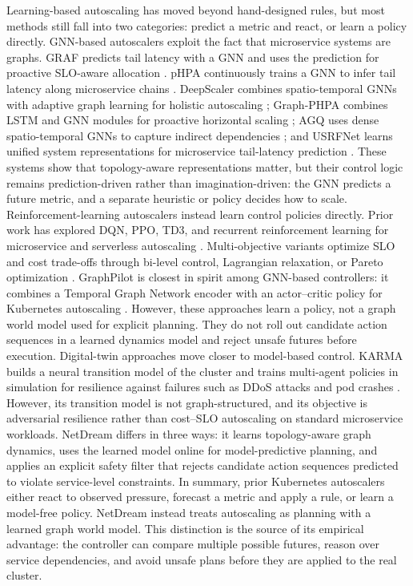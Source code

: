 Learning-based autoscaling has moved beyond hand-designed rules, but
most methods still fall into two categories: predict a metric and react,
or learn a policy directly.  GNN-based autoscalers exploit the fact that
microservice systems are graphs.  GRAF predicts tail latency with a GNN
and uses the prediction for proactive SLO-aware allocation
\citep{park2021graf}.  pHPA continuously trains a GNN to infer tail
latency along microservice chains \citep{choi2021phpa}.  DeepScaler
combines spatio-temporal GNNs with adaptive graph learning for holistic
autoscaling \citep{meng2023deepscaler}; Graph-PHPA combines LSTM and GNN
modules for proactive horizontal scaling \citep{dang2022graphphpa}; AGQ
uses dense spatio-temporal GNNs to capture indirect dependencies
\citep{liang2025agq}; and USRFNet learns unified system representations
for microservice tail-latency prediction \citep{zhang2025usrfnet}.  These
systems show that topology-aware representations matter, but their
control logic remains prediction-driven rather than imagination-driven:
the GNN predicts a future metric, and a separate heuristic or policy
decides how to scale. Reinforcement-learning autoscalers instead learn control policies
directly.  Prior work has explored DQN, PPO, TD3, and recurrent
reinforcement learning for microservice and serverless autoscaling
\citep{abdelkhaleq2023dqn,qiu2023aware,zhang2025kiss,drpc2024,
agarwal2024deep}.  Multi-objective variants optimize SLO and cost
trade-offs through bi-level control, Lagrangian relaxation, or Pareto
optimization \citep{wang2024autothrottle,wang2024deepscaling,
marchese2025slocost}.  GraphPilot is closest in spirit among GNN-based
controllers: it combines a Temporal Graph Network encoder with an
actor--critic policy for Kubernetes autoscaling
\citep{chen2025graphpilot}.  However, these approaches learn a policy,
not a graph world model used for explicit planning.  They do not roll out
candidate action sequences in a learned dynamics model and reject unsafe
futures before execution. Digital-twin approaches move closer to model-based control. KARMA builds
a neural transition model of the cluster and trains multi-agent policies
in simulation for resilience against failures such as DDoS attacks and
pod crashes \citep{karma2025}.  However, its transition model is not
graph-structured, and its objective is adversarial resilience rather than
cost--SLO autoscaling on standard microservice workloads. 
NetDream differs in three ways: it learns topology-aware graph dynamics, uses the learned model online for model-predictive planning, and applies an
explicit safety filter that rejects candidate action sequences predicted
to violate service-level constraints. 
In summary, prior Kubernetes autoscalers either react to observed
pressure, forecast a metric and apply a rule, or learn a model-free
policy. NetDream instead treats autoscaling as planning with a learned
graph world model.  This distinction is the source of its empirical
advantage: the controller can compare multiple possible futures, reason
over service dependencies, and avoid unsafe plans before they are applied
to the real cluster.